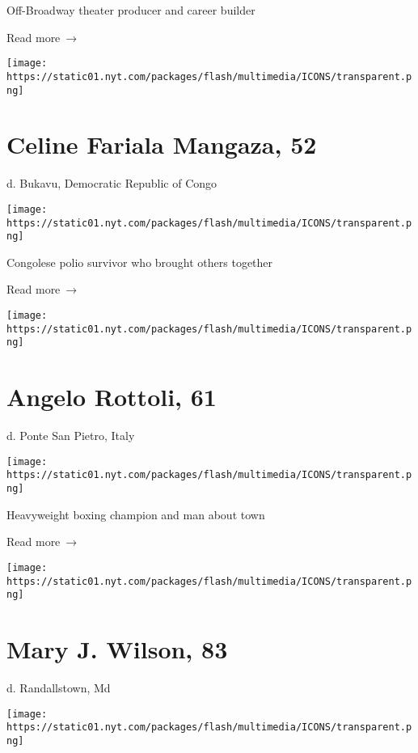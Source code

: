 Off-Broadway theater producer and career builder

 Read more~→

\href{https://www.nytimes.com/2020/06/03/obituaries/mama-leki-dead-coronavirus.html}{}

\texttt{[image: https://static01.nyt.com/packages/flash/multimedia/ICONS/transparent.png]}

\hypertarget{celine-fariala-mangaza-52}{%
\section{Celine Fariala Mangaza, 52}\label{celine-fariala-mangaza-52}}

d. Bukavu, Democratic Republic of Congo

\texttt{[image: https://static01.nyt.com/packages/flash/multimedia/ICONS/transparent.png]}

Congolese polio survivor who brought others together

 Read more~→

\href{https://www.nytimes.com/2020/06/03/obituaries/angelo-rottoli-dead-coronavirus.html}{}

\texttt{[image: https://static01.nyt.com/packages/flash/multimedia/ICONS/transparent.png]}

\hypertarget{angelo-rottoli-61}{%
\section{Angelo Rottoli, 61}\label{angelo-rottoli-61}}

d. Ponte San Pietro, Italy

\texttt{[image: https://static01.nyt.com/packages/flash/multimedia/ICONS/transparent.png]}

Heavyweight boxing champion and man about town

 Read more~→

\href{https://www.nytimes.com/2020/06/02/us/mary-j-wilson-dead-coronavirus.html}{}

\texttt{[image: https://static01.nyt.com/packages/flash/multimedia/ICONS/transparent.png]}

\hypertarget{mary-j-wilson-83}{%
\section{Mary J. Wilson, 83}\label{mary-j-wilson-83}}

d. Randallstown, Md

\texttt{[image: https://static01.nyt.com/packages/flash/multimedia/ICONS/transparent.png]}

